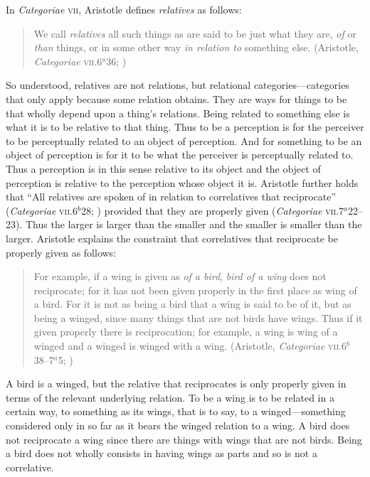 In \emph{Categoriae} \textsc{vii}, Aristotle defines \emph{relatives} as follows:
\begin{quote}
    We call \emph{relatives} all such things as are said to be just what they are, \emph{of} or \emph{than} things, or in some other way \emph{in relation to} something else. (Aristotle, \emph{Categoriae} \textsc{vii}.6\( ^{a} \)36; \citealt[17]{Ackrill:1963fk})
\end{quote}
So understood, relatives are not relations, but relational categories---categories that only apply because some relation obtains. They are ways for things to be that wholly depend upon a thing's relations. Being related to something else is what it is to be relative to that thing. Thus to be a perception is for the perceiver to be perceptually related to an object of perception. And for something to be an object of perception is for it to be what the perceiver is perceptually related to. Thus a perception is in this sense relative to its object and the object of perception is relative to the perception whose object it is. Aristotle further holds that ``All relatives are spoken of in relation to correlatives that reciprocate'' (\emph{Categoriae} \textsc{vii}.6\( ^{b} \)28; \citealt[18]{Ackrill:1963fk}) provided that they are properly given (\emph{Categoriae} \textsc{vii}.7\( ^{a} \)22--23). Thus the larger is larger than the smaller and the smaller is smaller than the larger. Aristotle explains the constraint that correlatives that reciprocate be properly given as follows:
\begin{quote}
    For example, if a wing is given as \emph{of a bird}, \emph{bird of a wing} does not reciprocate; for it has not been given properly in the first place as wing of a bird. For it is not as being a bird that a wing is said to be of it, but as being a winged, since many things that are not birds have wings. Thus if it given properly there is reciprocation; for example, a wing is wing of a winged and a winged is winged with a wing. (Aristotle, \emph{Categoriae} \textsc{vii}.6\( ^{b} \)38--7\( ^{a} \)5; \citealt[18--19]{Ackrill:1963fk})
\end{quote}
A bird is a winged, but the relative that reciprocates is only properly given in terms of the relevant underlying relation. To be a wing is to be related in a certain way, to something as its wings, that is to say, to a winged---something considered only in so far as it bears the winged relation to a wing. A bird does not reciprocate a wing since there are things with wings that are not birds. Being a bird does not wholly consists in having wings as parts and so is not a correlative.

